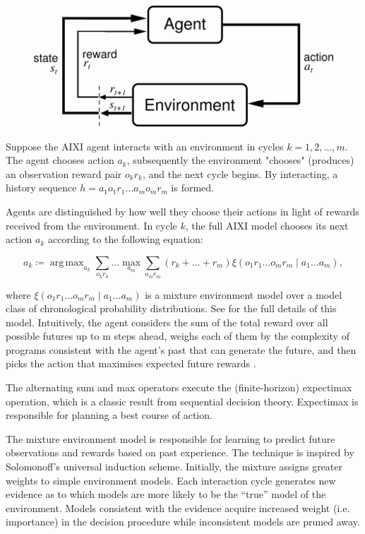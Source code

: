 \documentclass{article}
\theoremstyle{definition}
\newtheorem{primary statistics}[definition]{Primary Statistics}
\newtheorem{auxiliary statistics}[definition]{Auxiliary Statistics}
\DeclareMathOperator*{\argmax}{arg\,max} %
\begin{document}
\begin{figure}
\includegraphics[width = 12cm]{suttonbarto_rl}
	\caption{\citep{sutton1998reinforcement}}
\end{figure}
 

Suppose the AIXI agent interacts with an environment in cycles $k=1,2, \ldots, m$. The agent chooses action $a_k$, subsequently the environment "chooses" (produces) an observation reward pair $o_kr_k$, and the next cycle begins. By interacting, a history sequence $h=a_1o_1r_1 \ldots a_mo_mr_m$ is formed.

Agents are distinguished by how well they choose their actions in light of rewards received from the environment. In cycle $k$, the full AIXI model chooses its next action $a_k$ according to the following equation:

$$a_k \coloneqq \argmax_{a_k} \sum_{o_kr_k} \ldots \max_{a_m} \sum_{o_mr_m} (r_k+\ldots+r_m) \xi (o_1r_1 \ldots o_mr_m \mid a_1 \ldots a_m), $$

where $\xi (o_1r_1 \ldots o_mr_m \mid a_1 \ldots a_m)$ is a mixture environment model over a model class of chronological probability distributions. See \citep{hutter2005universal} for the full details of this model. Intuitively, the agent considers the sum of the total reward over all possible futures up to m steps ahead, weighs each of them by the complexity of programs consistent with the agent’s past that can generate the future, and then picks the action that maximises expected future rewards \citep{veness2011monte}. 

The alternating sum and max operators execute the (finite-horizon) expectimax operation, which is a classic result from sequential decision theory. Expectimax is responsible for planning a best course of action.

The mixture environment model is responsible for learning to predict future observations and rewards based on past experience. The technique is inspired by Solomonoff’s universal induction scheme. Initially, the mixture assigns greater weights to simple environment models. Each interaction cycle generates new evidence as to which models are more likely to be the “true” model of the environment. Models consistent with the evidence acquire increased weight (i.e. importance) in the decision procedure while inconsistent models are pruned away.
\end{document}
